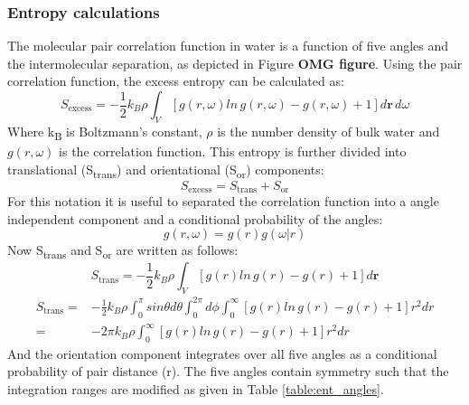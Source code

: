 \documentclass[12pt]{article}
\begin{document}
\subsubsection*{Entropy calculations}

The molecular pair correlation function in water is a function of five angles and the intermolecular separation, as depicted in Figure \textbf{\color{red}OMG figure}. Using the pair correlation function, the excess entropy can be calculated as:
\begin{equation}
    S_{\text{excess}} = - \frac{1}{2} k_B \rho \int_V [ g(r, \omega) ln \, g(r, \omega) - g(r, \omega) + 1 ] d \mathbf{r} \, d\omega
\end{equation}
Where k\textsubscript{B} is Boltzmann's constant, \(\rho\) is the number density of bulk water and \(g(r, \omega)\) is the correlation function. This entropy is further divided into translational (S\textsubscript{trans}) and orientational (S\textsubscript{or}) components:
\begin{equation}
    S_{\text{excess}} = S_{\text{trans}} + S_{\text{or}}
\end{equation}
For this notation it is useful to separated the correlation function into a angle independent component and a conditional probability of the angles:
\begin{equation}
    g(r, \omega) = g(r) g(\omega | r)
\end{equation}
Now S\textsubscript{trans} and S\textsubscript{or} are written as follows:
\begin{equation}
    S_{\text{trans}} = - \frac{1}{2} k_B \rho \int_V [ g(r) ln \,  g(r) - g(r) + 1 ] d \mathbf{r} 
\end{equation}
\begin{equation}
   \begin{split}
    S_{\text{trans}} = & - \frac{1}{2} k_B \rho \int_0^\pi sin \theta d \theta \int_0^{2\pi} d \phi \int_0^\infty   [ g(r) ln\,  g(r) - g(r) + 1 ] r^2 dr \\
     = &  - {2} \pi k_B \rho \int_0^\infty   [ g(r) ln \,  g(r) - g(r) + 1 ] r^2 dr 
  \end{split}
\end{equation}
And the orientation component integrates over all five angles as a conditional probability of pair distance (r). The five angles contain symmetry such that the integration ranges are modified as given in Table \ref{table:ent_angles}.
\end{document}
